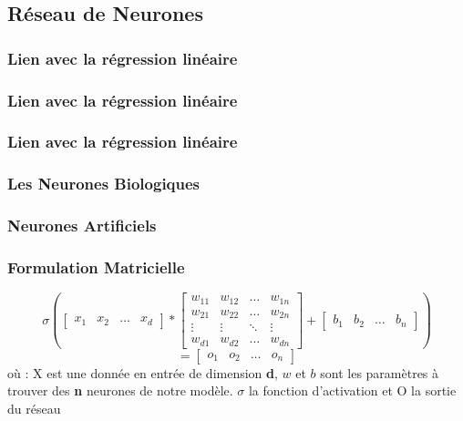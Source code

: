 \subsection{Réseau de Neurones}

\begin{frame}
  \frametitle{Lien avec la régression linéaire}
\end{frame}

\begin{frame}
  \frametitle{Lien avec la régression linéaire}
\end{frame}

\begin{frame}
  \frametitle{Lien avec la régression linéaire}
\end{frame}

\begin{frame}
  \frametitle{Les Neurones Biologiques}
\end{frame}

\begin{frame}
  \frametitle{Neurones Artificiels}
\end{frame}

\begin{frame}
  \frametitle{Formulation Matricielle}
  \[
  \sigma \left(
  \begin{bmatrix}
    x_{1} & x_{2} & \dots & x_{d}
  \end{bmatrix}
  *
  \begin{bmatrix}
    w_{11} & w_{12} & \dots  & w_{1n} \\
    w_{21} & w_{22} & \dots  & w_{2n} \\
    \vdots & \vdots & \ddots & \vdots \\
    w_{d1} & w_{d2} & \dots  & w_{dn}
  \end{bmatrix}
  +
  \begin{bmatrix}
    b_{1} & b_{2} & \dots & b_{n}
  \end{bmatrix}
  \right )
  \]
  \[
  =
  \begin{bmatrix}
    o_{1} & o_{2} & \dots & o_{n}
  \end{bmatrix}
  \]
  \newline
  où :
  \newline
  X est une donnée en entrée de dimension \textbf{d},
  \newline
  $w$ et $b$ sont les paramètres à trouver des \textbf{n} neurones de notre modèle.
  \newline
  $\sigma$ la fonction d'activation et
  \newline
  O la sortie du réseau
\end{frame}

